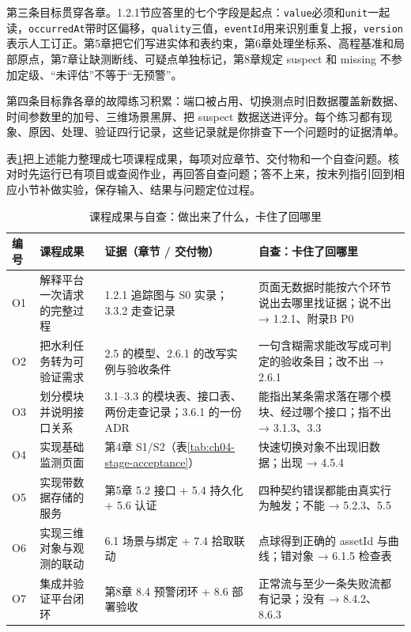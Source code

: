 第三条目标贯穿各章。1.2.1节应答里的七个字段是起点：\texttt{value}必须和\texttt{unit}一起读，\texttt{occurredAt}带时区偏移，\texttt{quality}三值，\texttt{eventId}用来识别重复上报，\texttt{version}表示人工订正。第5章把它们写进实体和表约束，第6章处理坐标系、高程基准和局部原点，第7章让缺测断线、可疑点单独标记，第8章规定 suspect 和 missing 不参加定级、“未评估”不等于“无预警”。

第四条目标靠各章的故障练习积累：端口被占用、切换测点时旧数据覆盖新数据、时间参数里的加号、三维场景黑屏、把 suspect 数据送进评分。每个练习都有现象、原因、处理、验证四行记录，这些记录就是你排查下一个问题时的证据清单。

表\ref{tab:ch09-outcomes}把上述能力整理成七项课程成果，每项对应章节、交付物和一个自查问题。核对时先运行已有项目或查阅作业，再回答自查问题；答不上来，按末列指引回到相应小节补做实验，保存输入、结果与问题定位过程。

\begin{table}[htbp]
\centering
\caption{课程成果与自查：做出来了什么，卡住了回哪里}
\label{tab:ch09-outcomes}
\begin{tabular}{p{0.6cm}p{3.6cm}p{3.8cm}p{5.0cm}}
\toprule
编号 & 课程成果 & 证据（章节 / 交付物） & 自查：卡住了回哪里 \\
\midrule
O1 & 解释平台一次请求的完整过程 & 1.2.1 追踪图与 S0 实录；3.3.2 走查记录 & 页面无数据时能按六个环节说出去哪里找证据；说不出 → 1.2.1、附录B P0 \\
O2 & 把水利任务转为可验证需求 & 2.5 的模型、2.6.1 的改写实例与验收条件 & 一句含糊需求能改写成可判定的验收条目；改不出 → 2.6.1 \\
O3 & 划分模块并说明接口关系 & 3.1--3.3 的模块表、接口表、两份走查记录；3.6.1 的一份 ADR & 能指出某条需求落在哪个模块、经过哪个接口；指不出 → 3.1.3、3.3 \\
O4 & 实现基础监测页面 & 第4章 S1/S2（表\ref{tab:ch04-stage-acceptance}） & 快速切换对象不出现旧数据；出现 → 4.5.4 \\
O5 & 实现带数据存储的服务 & 第5章 5.2 接口 + 5.4 持久化 + 5.6 认证 & 四种契约错误都能由真实行为触发；不能 → 5.2.3、5.5 \\
O6 & 实现三维对象与观测的联动 & 6.1 场景与绑定 + 7.4 拾取联动 & 点球得到正确的 assetId 与曲线；错对象 → 6.1.5 检查表 \\
O7 & 集成并验证平台闭环 & 第8章 8.4 预警闭环 + 8.6 部署验收 & 正常流与至少一条失败流都有记录；没有 → 8.4.2、8.6.3 \\
\bottomrule
\end{tabular}
\end{table}

